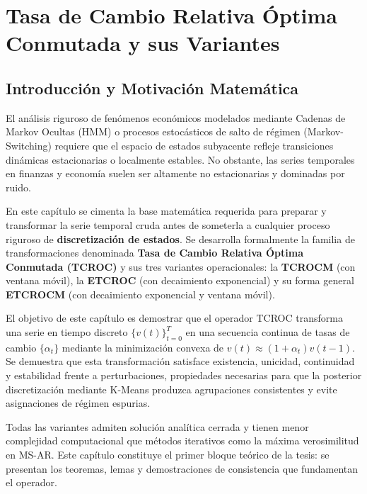 \chapter{Tasa de Cambio Relativa Óptima Conmutada y sus Variantes}
\label{cap:tcroc}


\section{Introducción y Motivación Matemática}
\label{sec:tcroc_introduccion}

El análisis riguroso de fenómenos económicos modelados mediante Cadenas de Markov Ocultas (HMM) o procesos estocásticos de salto de régimen (Markov-Switching) requiere que el espacio de estados subyacente refleje transiciones dinámicas estacionarias o localmente estables. No obstante, las series temporales en finanzas y economía suelen ser altamente no estacionarias y dominadas por ruido. 

En este capítulo se cimenta la base matemática requerida para preparar y transformar la serie temporal cruda antes de someterla a cualquier proceso riguroso de \textbf{discretización de estados}. Se desarrolla formalmente la familia de transformaciones denominada \textbf{Tasa de Cambio Relativa Óptima Conmutada (TCROC)} y sus tres variantes operacionales: la \textbf{TCROCM} (con ventana móvil), la \textbf{ETCROC} (con decaimiento exponencial) y su forma general \textbf{ETCROCM} (con decaimiento exponencial y ventana móvil).

El objetivo de este capítulo es demostrar que el operador TCROC transforma una serie en tiempo discreto $\{v(t)\}_{t=0}^T$ en una secuencia continua de tasas de cambio $\{\alpha_t\}$ mediante la minimización convexa de $v(t) \approx (1+\alpha_t)v(t-1)$. Se demuestra que esta transformación satisface existencia, unicidad, continuidad y estabilidad frente a perturbaciones, propiedades necesarias para que la posterior discretización mediante K-Means produzca agrupaciones consistentes y evite asignaciones de régimen espurias.

Todas las variantes admiten solución analítica cerrada y tienen menor complejidad computacional que métodos iterativos como la máxima verosimilitud en MS-AR. Este capítulo constituye el primer bloque teórico de la tesis: se presentan los teoremas, lemas y demostraciones de consistencia que fundamentan el operador.

